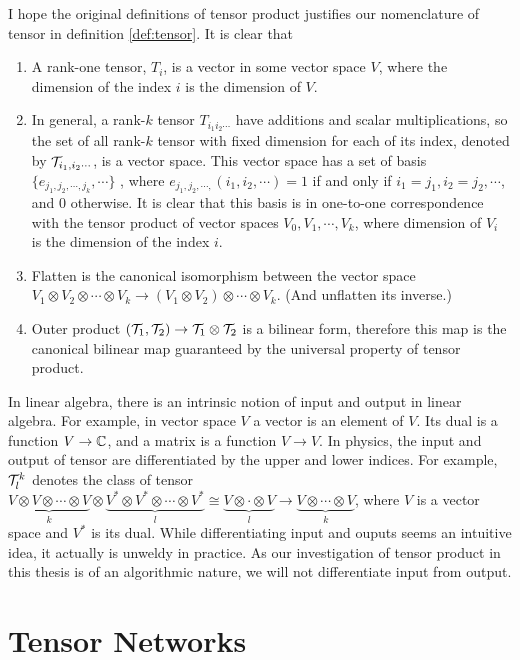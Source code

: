 I hope the original definitions of tensor product justifies our nomenclature of tensor in definition \ref{def:tensor}.
It is clear that 
\begin{enumerate}
	\item A rank-one tensor, $T_i$, is a vector in some vector space $V$,
		where the dimension of the index $i$ is the dimension of $V$.
	\item In general, a rank-$k$ tensor $T_{i_1 i_2 \cdots}$ have additions and scalar multiplications, so the set of all rank-$k$ tensor with fixed dimension for each of its index, denoted by $\mathcal{T}_{i_1, i_2 \cdots}$, is a vector space.
	This vector space has a set of basis $\{e_{j_1, j_2, \cdots, j_k}, \cdots\}$ , where $e_{j_1, j_2, \cdots,}(i_1, i_2, \cdots) = 1$ if and only if $i_1 = j_1, i_2 = j_2, \cdots$, and $0$ otherwise.
	It is clear that this basis is in one-to-one correspondence with the tensor product of vector spaces $V_0, V_1, \cdots, V_k$, where dimension of $V_i$ is the dimension of the index $i$.
	\item Flatten is the canonical isomorphism between the vector space $V_1 \otimes V_2 \otimes \cdots \otimes V_k \rightarrow (V_1 \otimes V_2) \otimes \cdots \otimes V_k$. (And unflatten its inverse.)
	\item Outer product $(\mathcal{T}_1, \mathcal{T}_2) \rightarrow \mathcal{T}_1 \otimes \mathcal{T}_2$ is a bilinear form, therefore this map is the canonical bilinear map guaranteed by the universal property of tensor product.
\end{enumerate}

In linear algebra, there is an intrinsic notion of input and output in linear algebra. 
For example, in vector space $V$ a vector is an element of $V$. Its dual is a function $V \rightarrow \mathbb{C}$, and a matrix is a function $V \rightarrow V$.
In physics, the input and output of tensor are differentiated by the upper and lower indices. 
For example, $\mathcal{T}^k_l$ denotes the class of tensor $ \underbrace{V \otimes V \otimes \cdots \otimes V}_{k} \otimes \underbrace{V^* \otimes V^* \otimes \cdots \otimes V^*}_{l} \cong \underbrace{V \otimes  \cdot \otimes V}_{l} \rightarrow \underbrace{V \otimes \cdots \otimes V}_{k}$,
where $V$ is a vector space and $V^*$ is its dual.
While differentiating input and ouputs seems an intuitive idea, it actually is unweldy in practice.
As our investigation of tensor product in this thesis is of an algorithmic nature, we will not differentiate input from output.

\section{Tensor Networks}


